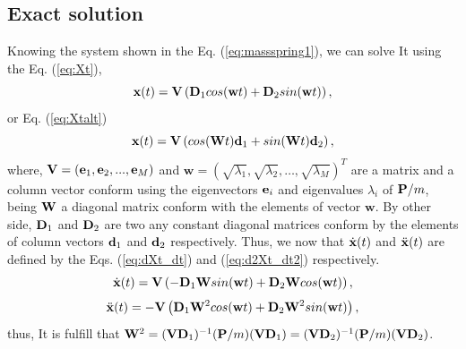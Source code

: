 \documentclass[11pt,twoside,a4paper]{article}
\newcommand{\MATRIX}[1]{\mathbf{\uppercase{#1}}}
\newcommand{\VECTOR}[1]{\mathbf{\lowercase{#1}}}
\begin{document}
\subsection{Exact solution}
Knowing the system shown in the Eq. (\ref{eq:massspring1}), we can solve It
using the Eq. (\ref{eq:Xt}),
\begin{equation}\label{eq:Xt}
 \VECTOR{X}(t)= \MATRIX{V}\left(\MATRIX{D}_1 cos(\mathbf{w}t) + \MATRIX{D}_2 sin(\mathbf{w}t) \right),
\end{equation}
or Eq. (\ref{eq:Xtalt})
\begin{equation}\label{eq:Xtalt}
 \VECTOR{X}(t)= \MATRIX{V}\left( cos(\MATRIX{W}t)\VECTOR{d}_1 +  sin(\MATRIX{W}t)\VECTOR{d}_2 \right),
\end{equation}
where, $\MATRIX{V}=\left(\VECTOR{e}_1,\VECTOR{e}_2, ..., \VECTOR{e}_M \right)$ and 
$\mathbf{w}=\left( \sqrt{\lambda_1},\sqrt{\lambda_2},\dots ,\sqrt{\lambda_M}\right)^{T}$ 
are a matrix and a column 
vector conform using the eigenvectors $\VECTOR{e}_i$ and eigenvalues $\lambda_i$ of
$\MATRIX{P}/m$, being $\MATRIX{W}$ a diagonal matrix conform with the elements of vector $\mathbf{w}$.
By other side, $\MATRIX{D}_1$ and $\MATRIX{D}_2$ are two any constant diagonal matrices
conform by the elements of column vectors $\VECTOR{d}_1$ and $\VECTOR{d}_2$ respectively.
Thus, we now that $\dot{\VECTOR{X}}(t)$ and $\ddot{\VECTOR{X}}(t)$ are defined by the Eqs. (\ref{eq:dXt_dt})
and (\ref{eq:d2Xt_dt2}) respectively.
\begin{equation}\label{eq:dXt_dt}
 \dot{\VECTOR{X}}(t)= \MATRIX{V}\left(-\MATRIX{D}_1 \MATRIX{W} sin(\mathbf{w}t) + \MATRIX{D}_2 \MATRIX{W} cos(\mathbf{w}t) \right),
\end{equation}
\begin{equation}\label{eq:d2Xt_dt2}
 \ddot{\VECTOR{X}}(t)= -\MATRIX{V}\left(\MATRIX{D}_1 \MATRIX{W}^2 cos(\mathbf{w}t) + \MATRIX{D}_2 \MATRIX{W}^2 sin(\mathbf{w}t) \right),
\end{equation}
thus, It is fulfill that $\MATRIX{W}^2=(\MATRIX{V} \MATRIX{D}_1)^{-1}(\MATRIX{P}/m)(\MATRIX{V} \MATRIX{D}_1)=(\MATRIX{V} \MATRIX{D}_2)^{-1}(\MATRIX{P}/m)( \MATRIX{V} \MATRIX{D}_2)$.
\end{document}
